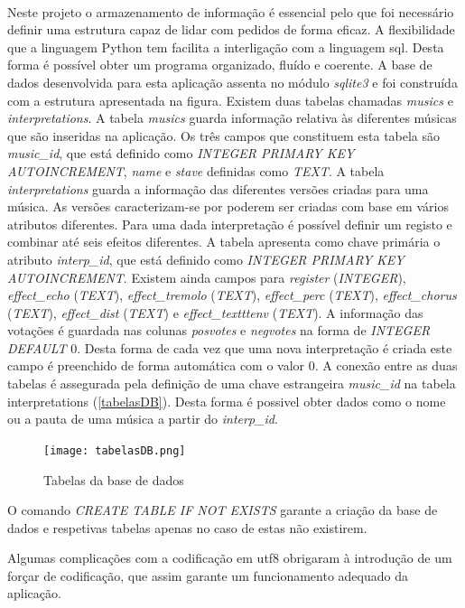 \documentclass[11pt,openany,twoside]{report}
\begin{document}
\paragraph{ } Neste projeto o armazenamento de informação é essencial pelo que foi necessário definir uma estrutura capaz de lidar com pedidos de forma eficaz. A flexibilidade que a linguagem Python tem facilita a interligação com a linguagem \ac{sql}. Desta forma é possível obter um programa organizado, fluído e coerente. A base de dados desenvolvida para esta aplicação assenta no módulo \textit{sqlite3} e foi construída com a estrutura apresentada na figura. Existem duas tabelas chamadas  \textit{musics} e \textit{interpretations}. A tabela \textit{musics} guarda informação relativa às diferentes músicas que são inseridas na aplicação. Os três campos que constituem esta tabela são \textit{music\_id}, que está definido como \textit{INTEGER PRIMARY KEY AUTOINCREMENT}, \textit{name} e \textit{stave} definidas como \textit{TEXT}. A tabela \textit{interpretations} guarda a informação das diferentes versões criadas para uma música. As versões caracterizam-se por poderem ser criadas com base em vários atributos diferentes. Para uma dada interpretação é possível definir um registo e combinar até seis efeitos diferentes. A tabela apresenta como chave primária o atributo \textit{interp\_id}, que está definido como \textit{INTEGER PRIMARY KEY AUTOINCREMENT}. Existem ainda campos para \textit{register} (\textit{INTEGER}), \textit{effect\_echo} (\textit{TEXT}), \textit{effect\_tremolo} (\textit{TEXT}), \textit{effect\_perc} (\textit{TEXT}), \textit{effect\_chorus} (\textit{TEXT}), \textit{effect\_dist} (\textit{TEXT}) e \textit{effect\_textttenv} (\textit{TEXT}). A informação das votações é guardada nas colunas \textit{posvotes} e \textit{negvotes} na forma de \textit{INTEGER DEFAULT} 0. Desta forma de cada vez que uma nova interpretação é criada este campo é preenchido de forma automática com o valor 0. A conexão entre as duas tabelas é assegurada pela definição de uma chave estrangeira \textit{music\_id} na tabela interpretations (\autoref{tabelasDB}). Desta forma é possivel obter dados como o nome ou a pauta de uma música a partir do \textit{interp\_id}.
 
\begin{figure}[h!]
 \center
 \texttt{[image: tabelasDB.png]}
 \caption{Tabelas da base de dados}
 \label{tabelasDB}
\end{figure}

O comando \textit{CREATE TABLE IF NOT EXISTS} garante a criação da base de dados e respetivas tabelas apenas no caso de estas não existirem. 

Algumas complicações com a codificação em \ac{utf8} obrigaram à introdução de um forçar de codificação, que assim garante um funcionamento adequado da aplicação.
\end{document}
